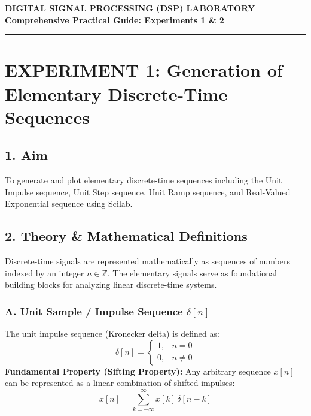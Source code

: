 \documentclass[11pt,a4paper]{article}
\begin{document}
\begin{center}
    {\Large \textbf{\textcolor{headcolor}{DIGITAL SIGNAL PROCESSING (DSP) LABORATORY}}}\\[0.2cm]
    {\large \textbf{Comprehensive Practical Guide: Experiments 1 \& 2}}\\[0.1cm]
    \rule{\linewidth}{0.5mm}
\end{center}

\vspace{0.2cm}

\section*{\textcolor{headcolor}{EXPERIMENT 1: Generation of Elementary Discrete-Time Sequences}}

\subsection*{1. Aim}
To generate and plot elementary discrete-time sequences including the Unit Impulse sequence, Unit Step sequence, Unit Ramp sequence, and Real-Valued Exponential sequence using Scilab.

\subsection*{2. Theory \& Mathematical Definitions}

Discrete-time signals are represented mathematically as sequences of numbers indexed by an integer $n \in \mathbb{Z}$. The elementary signals serve as foundational building blocks for analyzing linear discrete-time systems.

\subsubsection*{A. Unit Sample / Impulse Sequence $\delta[n]$}
The unit impulse sequence (Kronecker delta) is defined as:
\begin{equation}
    \delta[n] = 
    \begin{cases} 
        1, & n = 0 \\ 
        0, & n \ne 0 
    \end{cases}
\end{equation}
\textbf{Fundamental Property (Sifting Property):} Any arbitrary sequence $x[n]$ can be represented as a linear combination of shifted impulses:
\begin{equation}
    x[n] = \sum_{k=-\infty}^{\infty} x[k]\,\delta[n - k]
\end{equation}
\end{document}
